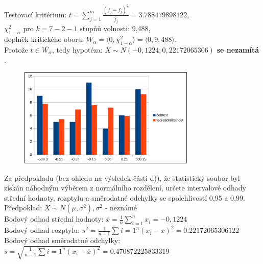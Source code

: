 \documentclass[11pt,a4paper]{article}
\begin{document}
Testovací kritérium: $ t = \sum\limits_{j=1}^{m} \frac{(f_j - \widehat{f_j})^2}{\widehat{f_j}} = 3.788479898122$, \\

$\chi_{1-\alpha}^2$ pro $ k = 7 - 2 - 1$ stupňů volnosti: 9,488, \\

doplněk kritického oboru: $ \overline{W_{\alpha}} = \langle 0, \chi_{1-\alpha}^2 \rangle = \langle 0, 9,488 \rangle$. \\

Protože $ t \in \overline{W_{\alpha}} $, tedy hypotéza: $ X \sim N(-0,1224; 0,22172065306) $ \textbf{se nezamítá} . \\

\begin{figure}[H]
    \centering
    \includegraphics[width=0.75\textwidth]{img/1dhistogram.pdf}
\end{figure}

\noindent\makebox[\linewidth]{\rule{\textwidth}{0.4pt}}

Za předpokladu (bez ohledu na výsledek části d)), že statistický soubor byl získán náhodným výběrem z normálního rozdělení, určete intervalové odhady střední hodnoty, rozptylu a směrodatné
odchylky se spolehlivostí 0,95 a 0,99. \\

Předpoklad: $ X \sim N(\mu, \sigma^2), \sigma^2$ - neznámé \\

Bodový odhad střední hodnoty: $ \overline{x} = \frac{1}{n} \sum\limits_{i=1}^{n} x_i = -0,1224 $ \\

Bodový odhad rozptylu: $ s^2 = \frac{1}{n-1} \sum\limits{i=1}^{n} (x_i - \overline{x})^2 = 0.22172065306122 $ \\

Bodový odhad směrodatné odchylky: $ s = \sqrt{\frac{1}{n-1} \sum\limits{i=1}^{n} (x_i - \overline{x})^2} = 0.470872225833319 $ \\ 
\end{document}
